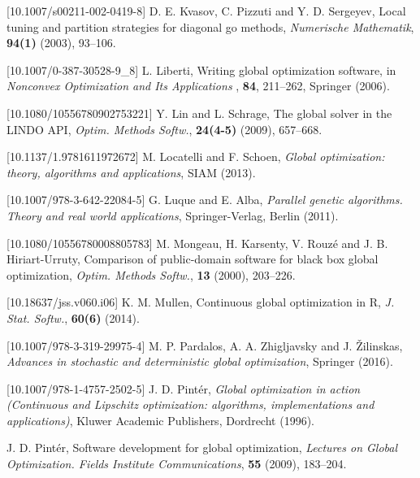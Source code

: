\documentclass{aims}
\theoremstyle{definition}
\begin{document}
\begin{thebibliography}{10}
[10.1007/s00211-002-0419-8]
\newblock D. E. Kvasov, C. Pizzuti and Y. D. Sergeyev,
\newblock Local tuning and partition strategies for diagonal go methods,
\newblock \emph{Numerische Mathematik}, \textbf{94(1)} (2003), 93--106.

[10.1007/0-387-30528-9_8]
\newblock L. Liberti,
\newblock Writing global optimization software,
\newblock in \emph{Nonconvex Optimization and Its Applications }, \textbf{84}, 211--262,
\newblock Springer (2006).

[10.1080/10556780902753221]
\newblock Y. Lin and L. Schrage,
\newblock The global solver in the LINDO API,
\newblock \emph{Optim. Methods Softw.}, \textbf{24(4-5)} (2009), 657--668.

[10.1137/1.9781611972672]
\newblock M. Locatelli and F. Schoen,
\newblock \emph{Global optimization: theory, algorithms and applications},
\newblock SIAM (2013).

[10.1007/978-3-642-22084-5]
\newblock G. Luque and E. Alba,
\newblock \emph{Parallel genetic algorithms. Theory and real world applications},
\newblock Springer-Verlag, Berlin (2011).

[10.1080/10556780008805783]
\newblock M. Mongeau, H. Karsenty, V. Rouzé and J. B. Hiriart-Urruty,
\newblock Comparison of public-domain software for black box global optimization,
\newblock \emph{Optim. Methods Softw.}, \textbf{13} (2000), 203--226.

[10.18637/jss.v060.i06]
\newblock K. M. Mullen,
\newblock Continuous global optimization in R,
\newblock \emph{J. Stat. Softw.}, \textbf{60(6)} (2014).

[10.1007/978-3-319-29975-4]
\newblock M. P. Pardalos, A. A. Zhigljavsky and J. \v Zilinskas,
\newblock \emph{Advances in stochastic and deterministic global optimization},
\newblock Springer (2016).

[10.1007/978-1-4757-2502-5]
\newblock J. D. Pint\'er,
\newblock \emph{Global optimization in action (Continuous and Lipschitz optimization: algorithms, implementations and applications)},
\newblock Kluwer Academic Publishers, Dordrecht (1996).

\newblock J. D. Pint\'er,
\newblock Software development for global optimization,
\newblock \emph{Lectures on Global Optimization. Fields Institute Communications}, \textbf{55} (2009), 183--204.


\end{thebibliography}
\end{document}

